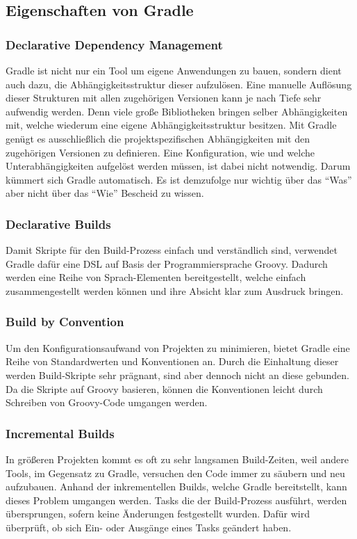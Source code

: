 \subsection{Eigenschaften von Gradle}
\subsubsection{Declarative Dependency Management}
Gradle ist nicht nur ein Tool um eigene Anwendungen zu bauen, sondern dient auch dazu, die Abhängigkeitsstruktur dieser aufzulösen. Eine manuelle Auflösung dieser Strukturen mit allen zugehörigen Versionen kann je nach Tiefe sehr aufwendig werden. Denn viele große Bibliotheken bringen selber Abhängigkeiten mit, welche wiederum eine eigene Abhängigkeitsstruktur besitzen. Mit Gradle genügt es ausschließlich die projektspezifischen Abhängigkeiten mit den zugehörigen Versionen zu definieren. Eine Konfiguration, wie und welche Unterabhängigkeiten aufgelöst werden müssen, ist dabei nicht notwendig. Darum kümmert sich Gradle automatisch. Es ist demzufolge nur wichtig über das \enquote{Was} aber nicht über das \enquote{Wie} Bescheid zu wissen.

\subsubsection{Declarative Builds}
Damit Skripte für den Build-Prozess einfach und verständlich sind, verwendet Gradle dafür eine \gls{DSL} auf Basis der Programmiersprache Groovy. Dadurch werden eine Reihe von Sprach-Elementen bereitgestellt, welche einfach zusammengestellt werden können und ihre Absicht klar zum Ausdruck bringen.

\subsubsection{Build by Convention}
Um den Konfigurationsaufwand von Projekten zu minimieren, bietet Gradle eine Reihe von Standardwerten und Konventionen an. Durch die Einhaltung dieser werden Build-Skripte sehr prägnant, sind aber dennoch nicht an diese gebunden. Da die Skripte auf Groovy basieren, können die Konventionen leicht durch Schreiben von Groovy-Code umgangen werden.

\subsubsection{Incremental Builds}
In größeren Projekten kommt es oft zu sehr langsamen Build-Zeiten, weil andere Tools, im Gegensatz zu Gradle, versuchen den Code immer zu säubern und neu aufzubauen. Anhand der inkrementellen Builds, welche Gradle bereitstellt, kann dieses Problem umgangen werden. Tasks die der Build-Prozess ausführt, werden übersprungen, sofern keine Änderungen festgestellt wurden. Dafür wird überprüft, ob sich Ein- oder Ausgänge eines Tasks geändert haben.

